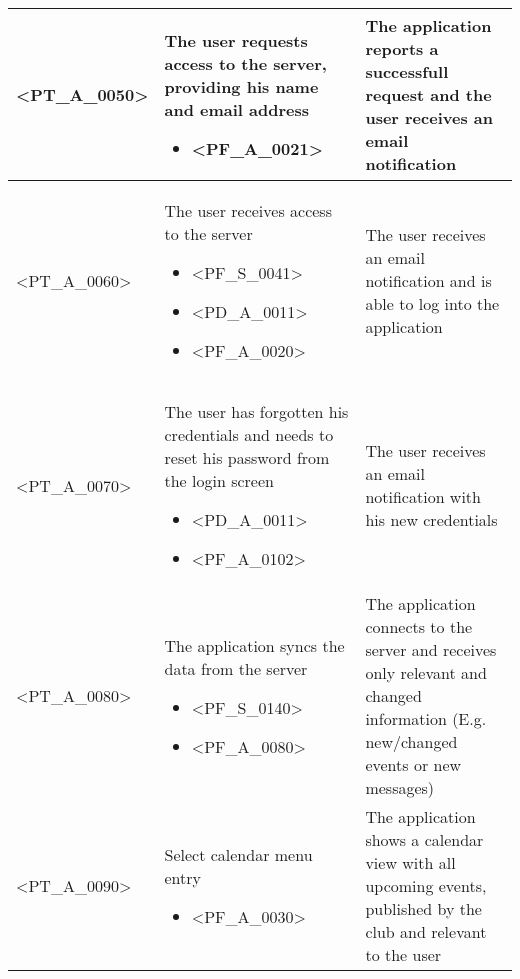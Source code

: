 \begin{longtable} {| p{} | p{} | p{} |}
    <PT\_A\_0050> & 
    The user requests access to the server, providing his name and email address 
        \begin{itemize}
            \item <PF\_A\_0021>
        \end{itemize} & 
    The application reports a successfull request and the user receives an email notification \\ \hline
    
    <PT\_A\_0060> & 
    The user receives access to the server
        \begin{itemize}
            \item <PF\_S\_0041>
            \item <PD\_A\_0011>
            \item <PF\_A\_0020>
        \end{itemize} & 
    The user receives an email notification and is able to log into the application \\ \hline
    
    <PT\_A\_0070> & 
    The user has forgotten his credentials and needs to reset his password from the login screen
        \begin{itemize}
            \item <PD\_A\_0011>
            \item <PF\_A\_0102>
        \end{itemize} & 
    The user receives an email notification with his new credentials \\ \hline
    
    <PT\_A\_0080> & 
    The application syncs the data from the server
        \begin{itemize}
            \item <PF\_S\_0140>
            \item <PF\_A\_0080>
        \end{itemize} & 
    The application connects to the server and receives only relevant and changed information (E.g. new/changed events or new messages) \\ \hline

    <PT\_A\_0090> & 
    Select calendar menu entry
        \begin{itemize}
            \item <PF\_A\_0030>
        \end{itemize} & 
    The application shows a calendar view with all upcoming events, published by the club and relevant to the user \\ \hline


\end{longtable}
